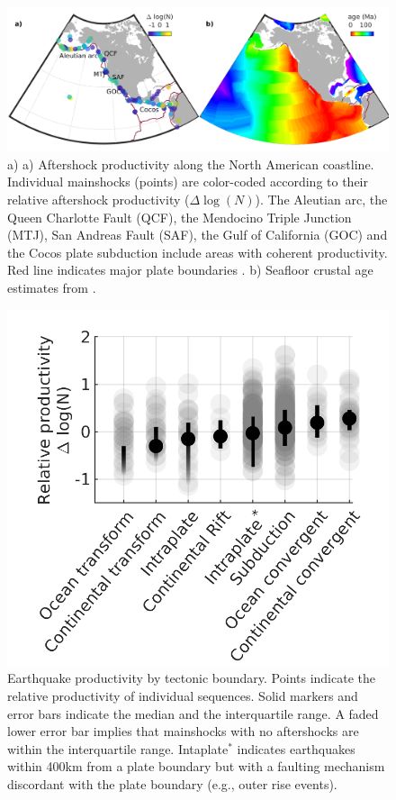\documentclass[draft]{agujournal}
\begin{document}
\begin{figure}[H]
\centering
\includegraphics[width=\linewidth]{figures/regions_mw5.png}
\caption{a) a) Aftershock productivity along the North American coastline.  Individual mainshocks (points) are color-coded according to their relative aftershock productivity ($\Delta \log(N)$). The Aleutian arc, the Queen Charlotte Fault (QCF), the Mendocino Triple Junction (MTJ), San Andreas Fault (SAF), the Gulf of California (GOC) and the Cocos plate subduction include areas with coherent productivity. Red line indicates major plate boundaries \citep{Bird2003AnBoundaries}. b) Seafloor crustal age estimates from \citet{Muller2008}.}
\label{fig:region}
\end{figure}  

\begin{figure}[H]
\centering
\includegraphics{figures/prod_by_pb_mw5.png}
\caption{Earthquake productivity by tectonic boundary. Points indicate the relative productivity of individual sequences. Solid markers and error bars indicate the median and the interquartile range. A faded lower error bar implies that mainshocks with no aftershocks are within the interquartile range. Intaplate$^*$ indicates earthquakes within 400km from a plate boundary but with a faulting mechanism discordant with the plate boundary (e.g., outer rise events).}
\label{fig:plate_boundary}
\end{figure}    
\end{document}
